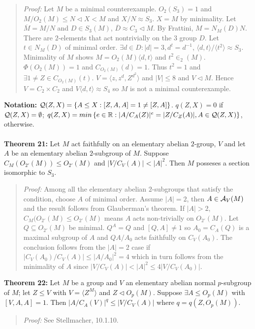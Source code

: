 \begin{quote}
\emph{Proof:}  Let $M$ be a minimal counterexample.  $O_2(S_3)=1$ and $M/O_2(M) \leq N \lhd X < M$ and $X/N \approx S_3$.
$X=M$ by minimality.  Let ${\overline M}= M/N$ and $D \in S_3(M)$, ${\overline D} \approx C_3 \lhd M$.
By Frattini, $M= N_M(D) N$.  There are $2$-elements that act nontrivially on the $3$ group $D$.  Let $t \in N_M(D)$
of minimal order.  $\exists d \in D: |d|=3, d^t= d^{-1}$, $\langle d, t \rangle/\langle t^2 \rangle \approx S_3$.
Minimality of $M$ shows  $M= O_2(M) \langle d,t \rangle$ and $t^2 \in _2(M)$.
$\Phi(O_2(M))= 1$ and $C_{O_2(M)}(d)=1$.  Thus  $t^2=1$ and $\exists 1 \neq Z \in C_{O_2(M)}(t)$.
$V= \langle z, z^d, Z^{d^2} \rangle$ and $|V| \leq 8$ and $V \lhd M$.  Hence $V= C_2 \times C_2$ and
$V \langle d, t \rangle \approx S_4$ so $M$ is not a minimal counterexample.
\end{quote}
{\bf Notation:}
${\cal Q}(Z, X)= \{ A \leq X: [Z,A,A]=1 \neq [Z,A] \}$.
$q(Z,X)= 0$ if ${\cal Q}(Z,X)= \emptyset$;
$q(Z,X)= min \thinspace \{e \in {\mathbb R}: |A/C_A(Z)|^e= |Z/C_Z(A)|, A \in {\cal Q}(Z,X) \}$, otherwise.
\\
\\
{\bf Theorem 21:}
Let $M$ act faithfully on an elementary abelian $2$-group, $V$ and let
$A$ be an elementary abelian $2$-subgroup of $M$.  Suppose
$C_M(O_{2'}(M)) \leq O_{2'}(M)$ and $|V/C_V(A)| < |A|^2$.  Then
$M$ posseses a section isomorphic to $S_3$.
\begin{quote}
\emph{Proof:}  Among all the elementary abelian $2$-subgroups that satisfy the condition, choose $A$ of minimal order.
Assume $|A|=2$, then $A \in {\cal A}_V(M)$ and the result follows from Glauberman's theorem.
If $|A|>2$,$C_M(O_{2'}(M) \leq O_{2'}(M)$ means $A$ acts non-trivially on $O_{2'}(M)$.  Let $Q \subseteq O_{2'}(M)$
be minimal.  $Q^A=Q$ and $[Q,A] \neq 1$ so $A_0= C_A(Q)$ is a maximal subgroup of $A$ and
$QA/A_0$ acts faithfully on $C_V(A_0)$.  The conclusion follows from the $|A|=2$ case if
$|C_V(A_0)/C_V(A)| \leq |A/A_0|^2=4$ which in turn follows from the minimality of $A$ since
$|V/C_V(A)| < |A|^2 \leq 4 |V/C_V(A_0)|$.
\end{quote}
{\bf Theorem 22:}
Let $M$ be a group and $V$ an elementary abelian normal $p$-subgroup of $M$; let $Z \leq V$ with
$V= \langle Z^M \rangle$ and $Z \lhd O_p(M)$.  Suppose $\exists A \leq O_p(M)$ with $[V,A,A]=1$.
Then $|A/C_A(V)|^q \leq |V/C_V(A)|$ where $q= q(Z,O_p(M))$.
\begin{quote}
\emph{Proof:}  See Stellmacher, 10.1.10.
\end{quote}
